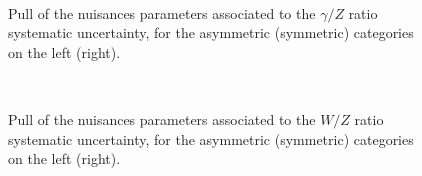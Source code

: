 \begin{figure}[tbhp]
    \caption{ Pull of the nuisances parameters associated to the $\gamma/Z$ ratio systematic uncertainty, 
      for the asymmetric (symmetric) categories on the left (right).
      \label{fig:nuisPull_gamma_Z_ratio}}
  \begin{center}
     ~~
  \end{center}
\end{figure}

\begin{figure}[tbhp]
    \caption{ Pull of the nuisances parameters associated to the $W/Z$ ratio systematic uncertainty, 
      for the asymmetric (symmetric) categories on the left (right).
      \label{fig:nuisPull_W_Z_ratio}}
  \begin{center}
     ~~
  \end{center}
\end{figure}


